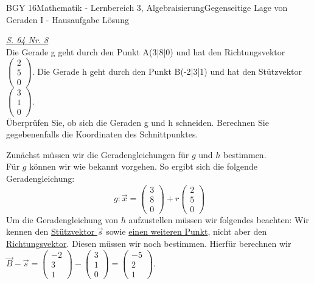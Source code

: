 \documentclass[oneside,openany,headings=optiontotoc,11pt,numbers=noenddot]{scrreprt}
\begin{document}
\begin{worksheet}{BGY 16}{Mathematik - Lernbereich 3, Algebraisierung}{Gegenseitige Lage von Geraden I - Hausaufgabe Lösung}
		\begin{framed}
			\noindent
			\underline{\textit{S. 64 Nr. 8}}\\
			Die Gerade g geht durch den Punkt A(3|8|0) und hat den Richtungsvektor \(\left(\begin{array}{c}2\\5\\0\end{array}\right)\). Die Gerade h geht durch den Punkt B(-2|3|1) und hat den Stützvektor \(\left(\begin{array}{c}3\\1\\0\end{array}\right)\).\\
			Überprüfen Sie, ob sich die Geraden g und h schneiden. Berechnen Sie gegebenenfalls die Koordinaten des Schnittpunktes.\\
			\par\noindent
			Zunächst müssen wir die Geradengleichungen für \(g\) und \(h\) bestimmen.\\
			Für \(g\) können wir wie bekannt vorgehen. So ergibt sich die folgende Geradengleichung:
			\[g: \vec{x} = \left(\begin{array}{c}3\\8\\0\end{array}\right) + r\left(\begin{array}{c}2\\5\\0\end{array}\right)\]
			Um die Geradengleichung von \(h\) aufzustellen müssen wir folgendes beachten: Wir kennen den \color{codegreen}\underline{Stützvektor \(\vec{s}\)}\normalcolor{} sowie \color{codegreen}\underline{einen weiteren Punkt}\normalcolor, nicht aber den \color{red}\underline{Richtungsvektor}\normalcolor. Diesen müssen wir noch bestimmen. \tiny{\color{codegray}Hierfür berechnen wir \(\vec{B} - \vec{s} = \left(\begin{array}{c}-2\\3\\1\end{array}\right) - \left(\begin{array}{c}3\\1\\0\end{array}\right) = \left(\begin{array}{c}-5\\2\\1\end{array}\right)\).}

\end{framed}
\end{worksheet}
\end{document}
